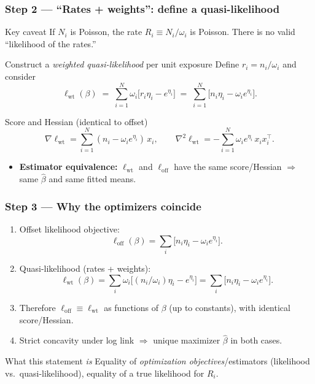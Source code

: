\documentclass[10pt,aspectratio=169,xcolor={dvipsnames},usepdftitle=false]{beamer}
\begin{document}
\begin{frame}
\frametitle{Step 2 — ``Rates + weights'': define a quasi-likelihood}
\small
\begin{alertblock}{Key caveat}
If $N_i$ is Poisson, the rate $R_i \equiv N_i/\omega_i$ is  Poisson. There is no valid ``likelihood of the rates.''
\end{alertblock}
\begin{block}{Construct a \emph{weighted quasi-likelihood} per unit exposure}
Define $r_i=n_i/\omega_i$ and consider
\[
\ell_{\mathrm{wt}}(\beta)\;=\;\sum_{i=1}^N \omega_i\big[r_i \eta_i - e^{\eta_i}\big]
\;=\;\sum_{i=1}^N \big[n_i \eta_i - \omega_i e^{\eta_i}\big].
\]
\end{block}
\begin{block}{Score and Hessian (identical to offset)}
\[
\nabla \ell_{\mathrm{wt}}=\sum_{i=1}^N (n_i-\omega_i e^{\eta_i})\,x_i,\qquad
\nabla^2 \ell_{\mathrm{wt}}=-\sum_{i=1}^N \omega_i e^{\eta_i}\,x_i x_i^\top.
\]
\end{block}
\begin{itemize}
\item \textbf{Estimator equivalence:} $\ell_{\mathrm{wt}}$ and $\ell_{\mathrm{off}}$ have the same score/Hessian $\Rightarrow$ same $\hat\beta$ and same fitted means.
\end{itemize}
\end{frame}

\begin{frame}
\frametitle{Step 3 — Why the optimizers coincide}
\small
\begin{enumerate}
\item Offset likelihood objective:
\[
\ell_{\mathrm{off}}(\beta)=\sum_i \big[n_i \eta_i - \omega_i e^{\eta_i}\big].
\]
\item Quasi-likelihood (rates + weights):
\[
\ell_{\mathrm{wt}}(\beta)=\sum_i \omega_i\big[(n_i/\omega_i)\eta_i - e^{\eta_i}\big]
=\sum_i \big[n_i \eta_i - \omega_i e^{\eta_i}\big].
\]
\item Therefore $\ell_{\mathrm{off}}\equiv \ell_{\mathrm{wt}}$ as functions of $\beta$ (up to constants), with identical score/Hessian.
\item Strict concavity under log link $\Rightarrow$ unique maximizer $\hat\beta$ in both cases.
\end{enumerate}
\begin{block}{What this statement \emph{is}}
Equality of \emph{optimization objectives}/estimators (likelihood vs.\ quasi-likelihood),  equality of a true likelihood for $R_i$.
\end{block}
\end{frame}
\end{document}
